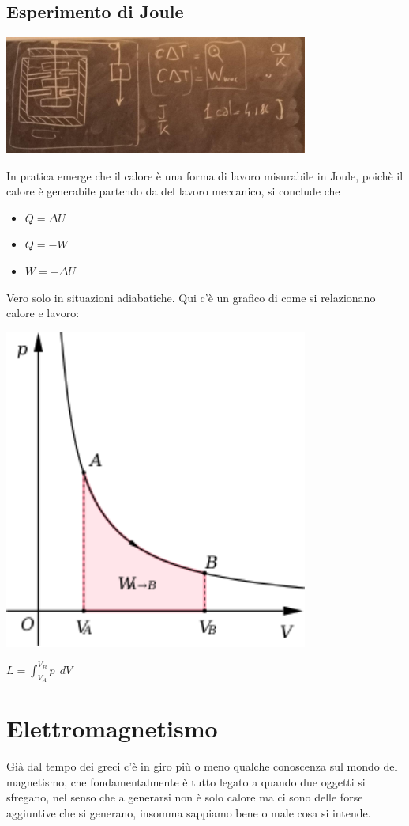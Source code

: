 \documentclass[12pt, a4paper, openany, oneside]{book}
\begin{document}
\section{Esperimento di Joule}
\begin{center}
\includegraphics[width=0.75\textwidth]{17}
\end{center}
In pratica emerge che il calore è una forma di lavoro misurabile in Joule, 
poichè il calore è generabile partendo da del lavoro meccanico, si conclude che
\begin{itemize}
	\item $Q = \Delta U$
	\item $Q = -W$
	\item $W = -\Delta U $
\end{itemize}
Vero solo in situazioni adiabatiche. Qui c'è un grafico di come si relazionano
calore e lavoro:
\begin{center}
\includegraphics[width=0.75\textwidth]{18}
\end{center}
$L = \int_{V_{A}}^{V_{B}} p~~ dV$
\chapter{Elettromagnetismo}
Già dal tempo dei greci c'è in giro più o meno qualche conoscenza sul mondo del
magnetismo, che fondamentalmente è tutto legato a quando due oggetti si 
sfregano, nel senso che a generarsi non è solo calore ma ci sono delle forse 
aggiuntive che si generano, insomma sappiamo bene o male cosa si intende.
\end{document}

